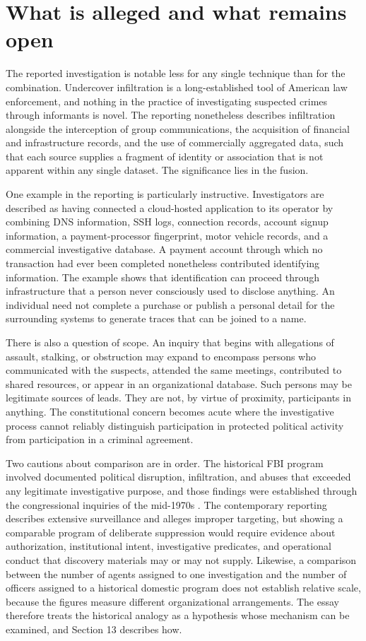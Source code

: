 \documentclass[11pt]{article}
\theoremstyle{definition}
\theoremstyle{remark}
\begin{document}
\section{What is alleged and what remains open}

The reported investigation is notable less for any single technique than for the combination. Undercover infiltration is a long-established tool of American law enforcement, and nothing in the practice of investigating suspected crimes through informants is novel. The reporting nonetheless describes infiltration alongside the interception of group communications, the acquisition of financial and infrastructure records, and the use of commercially aggregated data, such that each source supplies a fragment of identity or association that is not apparent within any single dataset. The significance lies in the fusion.

One example in the reporting is particularly instructive. Investigators are described as having connected a cloud-hosted application to its operator by combining DNS information, SSH logs, connection records, account signup information, a payment-processor fingerprint, motor vehicle records, and a commercial investigative database. A payment account through which no transaction had ever been completed nonetheless contributed identifying information. The example shows that identification can proceed through infrastructure that a person never consciously used to disclose anything. An individual need not complete a purchase or publish a personal detail for the surrounding systems to generate traces that can be joined to a name.

There is also a question of scope. An inquiry that begins with allegations of assault, stalking, or obstruction may expand to encompass persons who communicated with the suspects, attended the same meetings, contributed to shared resources, or appear in an organizational database. Such persons may be legitimate sources of leads. They are not, by virtue of proximity, participants in anything. The constitutional concern becomes acute where the investigative process cannot reliably distinguish participation in protected political activity from participation in a criminal agreement.

Two cautions about comparison are in order. The historical FBI program involved documented political disruption, infiltration, and abuses that exceeded any legitimate investigative purpose, and those findings were established through the congressional inquiries of the mid-1970s \cite{church1976}. The contemporary reporting describes extensive surveillance and alleges improper targeting, but showing a comparable program of deliberate suppression would require evidence about authorization, institutional intent, investigative predicates, and operational conduct that discovery materials may or may not supply. Likewise, a comparison between the number of agents assigned to one investigation and the number of officers assigned to a historical domestic program does not establish relative scale, because the figures measure different organizational arrangements. The essay therefore treats the historical analogy as a hypothesis whose mechanism can be examined, and Section 13 describes how.
\end{document}
